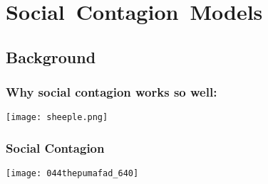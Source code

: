 

\section{Social\ Contagion\ Models}


\subsection{Background}

\begin{frame}
  \frametitle{Why social contagion works so well:}

  \begin{center}
    \texttt{[image: sheeple.png]}\\
  \end{center}

\end{frame}

\begin{frame}
  \frametitle{Social Contagion}

  \texttt{[image: 044thepumafad\_640]}

\end{frame}

